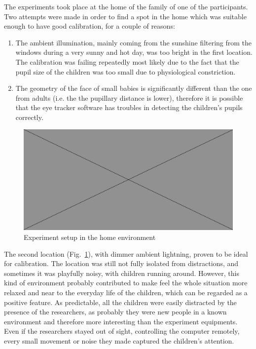 The experiments took place at the home of the family of one of the participants. Two attempts were made in order to find a spot in the home which was suitable enough to have good calibration, for a couple of reasons:
\begin{enumerate}
    \item The ambient illumination, mainly coming from the sunshine filtering from the windows during a very sunny and hot day, was too bright in the first location. The calibration was failing repeatedly most likely due to the fact that the pupil size of the children was too small due to physiological constriction.
    \item The geometry of the face of small babies is significantly different than the one from adults (i.e. the the pupillary distance is lower), therefore it is possible that the eye tracker software has troubles in detecting the children’s pupils correctly.
\end{enumerate}

\begin{figure}[h]
  \centering
  \includegraphics[width=1\textwidth]{figures/placeholderImg.jpg}
  \caption[experiment setup]{Experiment setup in the home environment}
  \label{fig:setupphoto}
\end{figure}

The second location (Fig.~\ref{fig:setupphoto}), with dimmer ambient lightning, proven to be ideal for calibration. The location was still not fully isolated from distractions, and sometimes it was playfully noisy, with children running around. However, this kind of environment probably contributed to make feel the whole situation more relaxed and near to the everyday life of the children, which can be regarded as a positive feature.
As predictable, all the children were easily distracted by the presence of the researchers, as probably they were new people in a known environment and therefore more interesting than the experiment equipments. Even if the researchers stayed out of sight, controlling the computer remotely, every small movement or noise they made captured the children’s attention.

